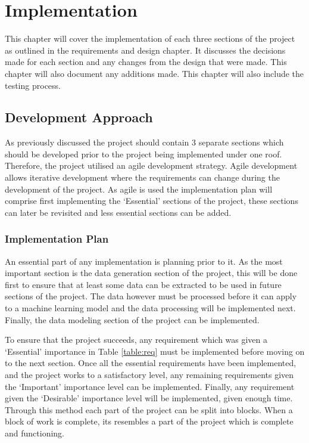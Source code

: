 \chapter{Implementation}
This chapter will cover the implementation of each three sections of the project as outlined in the requirements and design chapter. It discusses the decisions made for each section and any changes from the design that were made. This chapter will also document any additions made. This chapter will also include the testing process.

\section{Development Approach}

As previously discussed the project should contain 3 separate sections which should be developed prior to the project being implemented under one roof. Therefore, the project utilised an agile development strategy. Agile development allows iterative development where the requirements can change during the development of the project. As agile is used the implementation plan will comprise first implementing the ‘Essential’ sections of the project, these sections can later be revisited and less essential sections can be added.

\subsection{Implementation Plan}

An essential part of any implementation is planning prior to it. As the most important section is the data generation section of the project, this will be done first to ensure that at least some data can be extracted to be used in future sections of the project. The data however must be processed before it can apply to a machine learning model and the data processing will be implemented next. Finally, the data modeling section of the project can be implemented.

To ensure that the project succeeds, any requirement which was given a ‘Essential’ importance in Table \ref{table:req} must be implemented before moving on to the next section. Once all the essential requirements have been implemented, and the project works to a satisfactory level, any remaining requirements given the ‘Important’ importance level can be implemented. Finally, any requirement given the ‘Desirable’ importance level will be implemented, given enough time.
Through this method each part of the project can be split into blocks. When a block of work is complete, its resembles a part of the project which is complete and functioning. 
